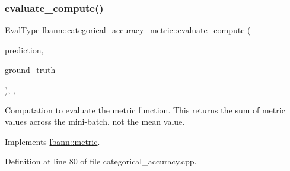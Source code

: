 \subsubsection{\texorpdfstring{evaluate\+\_\+compute()}{evaluate\_compute()}}
{\footnotesize\ttfamily \hyperlink{base_8hpp_a3266f5ac18504bbadea983c109566867}{Eval\+Type} lbann\+::categorical\+\_\+accuracy\+\_\+metric\+::evaluate\+\_\+compute (\begin{DoxyParamCaption}\item[{const \hyperlink{base_8hpp_a9a697a504ae84010e7439ffec862b470}{Abs\+Dist\+Mat} \&}]{prediction,  }\item[{const \hyperlink{base_8hpp_a9a697a504ae84010e7439ffec862b470}{Abs\+Dist\+Mat} \&}]{ground\+\_\+truth }\end{DoxyParamCaption})\hspace{0.3cm}{\ttfamily [override]}, {\ttfamily [protected]}, {\ttfamily [virtual]}}

Computation to evaluate the metric function. This returns the sum of metric values across the mini-\/batch, not the mean value. 

Implements \hyperlink{classlbann_1_1metric_aab79147ff480675db2e01d7a889a4296}{lbann\+::metric}.



Definition at line 80 of file categorical\+\_\+accuracy.\+cpp.


